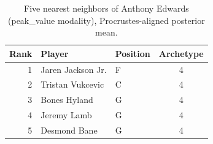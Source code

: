 \begin{table}[htbp]
  \centering\small
  \begin{tabular}{rllc}
    \toprule
    Rank & Player & Position & Archetype \\
    \midrule
    1 & Jaren Jackson Jr. & F & 4 \\
    2 & Tristan Vukcevic & C & 4 \\
    3 & Bones Hyland & G & 4 \\
    4 & Jeremy Lamb & G & 4 \\
    5 & Desmond Bane & G & 4 \\
    \bottomrule
  \end{tabular}
  \caption{Five nearest neighbors of Anthony Edwards (peak_value modality), Procrustes-aligned posterior mean.}
  \label{tab:Anthony_Edwards_neighbors_peak_value}
\end{table}

